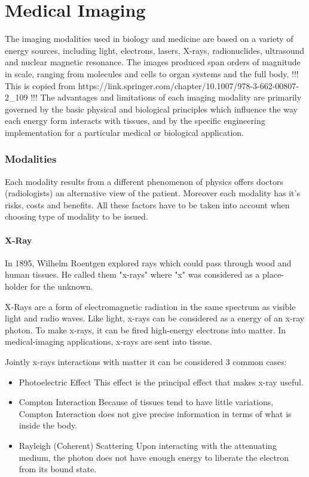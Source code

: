 \chapter{Medical Imaging}
\label{ch:rworks}

The imaging modalities used in biology and medicine are based on a variety of energy sources, including light, electrons, lasers, X-rays, radionuclides, ultrasound and nuclear magnetic resonance. The images produced span orders of magnitude in scale, ranging from molecules and cells to organ systems and the full body. !!! This is copied from https://link.springer.com/chapter/10.1007/978-3-662-00807-2_109 !!!
The advantages and limitations of each imaging modality are primarily governed by the basic physical and biological principles which influence the way each energy form interacts with tissues, and by the specific engineering implementation for a particular medical or biological application.

\subsection{Modalities}
Each modality results from a different phenomenon of physics offers doctors (radiologists) an alternative view of the patient. Moreover each modality has it's risks, costs and benefits. All these factors have to be taken into account when choosing type of modality to be issued.

\subsubsection{X-Ray}
In 1895, Wilhelm Roentgen explored rays which could pass through wood and human tissues. He called them "x-rays" where "x" was considered as a place-holder for the unknown.

X-Rays are a form of electromagnetic radiation in the same spectrum as visible light and radio waves. Like light, x-rays can be considered as a energy of an x-ray photon. To make x-rays, it can be fired high-energy electrons into matter. In medical-imaging applications, x-rays are sent into tissue. 

Jointly x-rays interactions with matter it can be considered 3 common cases:
\begin{itemize}
    \item Photoelectric Effect
    \newline This effect is the principal effect that makes x-ray useful.
    \item Compton Interaction
    \newline Because of tissues tend to have little variations, Compton Interaction does not give precise information in terms of what is inside the body. 
    \item Rayleigh (Coherent) Scattering
    \newline Upon interacting with the attenuating medium, the photon does not have enough energy to liberate the electron from its bound state.
\end{itemize}

